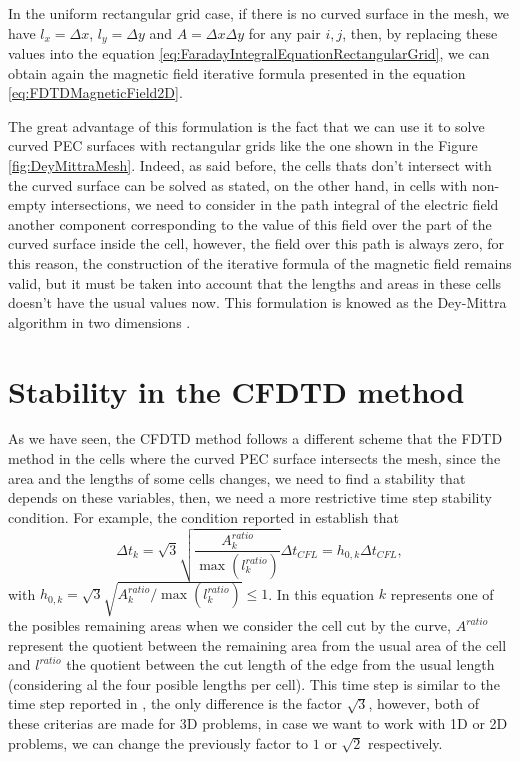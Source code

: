 \documentclass[12pt, oneside]{book}
\begin{document}
In the uniform rectangular grid case, if there is no curved surface in the mesh, we have $l_x = \Delta x$, $l_y = \Delta y$ and $A = \Delta x \Delta y$ for any pair $i,j$, then, by replacing these values into the equation \ref{eq:FaradayIntegralEquationRectangularGrid}, we can obtain again the magnetic field iterative formula presented in the equation \ref{eq:FDTDMagneticField2D}.

The great advantage of this formulation is the fact that we can use it to solve curved PEC surfaces with rectangular grids like the one shown in the Figure \ref{fig:DeyMittraMesh}. Indeed, as said before, the cells thats don't intersect with the curved surface can be solved as stated, on the other hand, in cells with non-empty intersections, we need to consider in the path integral of the electric field another component corresponding to the value of this field over the part of the curved surface inside the cell, however, the field over this path is always zero, for this reason, the construction of the iterative formula of the magnetic field remains valid, but it must be taken into account that the lengths and areas in these cells doesn't have the usual values now. This formulation is knowed as the Dey-Mittra algorithm in two dimensions \cite{DeyMittra1997}.

\section{Stability in the CFDTD method}

As we have seen, the CFDTD method follows a different scheme that the FDTD method in the cells where the curved PEC surface intersects the mesh, since the area and the lengths of some cells changes, we need to find a stability that depends on these variables, then, we need a more restrictive time step stability condition. For example, the condition reported in \cite{7518629} establish that
\begin{equation}
    \Delta t_k = \sqrt{3} \sqrt{\dfrac{A_k^{ratio}}{\max \left( l_k^{ratio} \right)}}\Delta t_{CFL} = h_{0, k} \Delta t_{CFL},
\label{eq:StabilityAngulo}
\end{equation}
with $h_{0, k} = \sqrt{3} \sqrt{A_k^{ratio}/\max \left( l_k^{ratio} \right)} \leq 1$. In this equation $k$ represents one of the posibles remaining areas when we consider the cell cut by the curve, $A^{ratio}$ represent the quotient between the remaining area from the usual area of the cell and $l^{ratio}$ the quotient between the cut length of the edge from the usual length (considering al the four posible lengths per cell). This time step is similar to the time step reported in \cite{1638381}, the only difference is the factor $\sqrt{3}$, however, both of these criterias are made for 3D problems, in case we want to work with 1D or 2D problems, we can change the previously factor to $1$ or $\sqrt{2}$ respectively.
\end{document}
